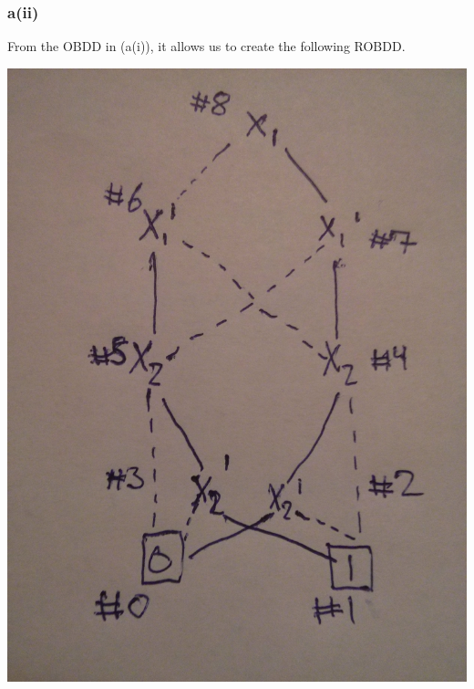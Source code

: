 \documentclass[12pt]{article}
\begin{document}
\subsubsection*{a(ii)}
From the OBDD in (a(i)), it allows us to create the following ROBDD.
\begin{center}
\includegraphics[scale=0.1]{7}
\end{center}

\newpage
\end{document}
